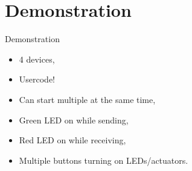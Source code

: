 \section{Demonstration}
    \begin{frame}[t]{Demonstration}
        \begin{itemize}
            \item 4 devices,
            \item Usercode!
            \item Can start multiple at the same time,
            \item Green LED on while sending,
            \item Red LED on while receiving,
            \item Multiple buttons turning on LEDs/actuators.
        \end{itemize}
    \end{frame}
